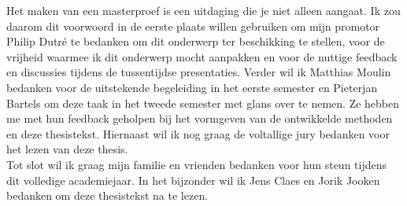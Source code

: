 \documentclass[master=cws,masteroption=mmc,oneside,english]{kulemt}
\begin{document}
\begin{preface}
  Het maken van een masterproef is een uitdaging die je niet alleen aangaat. Ik zou daarom dit voorwoord in de eerste plaats willen gebruiken om mijn promotor Philip Dutré te bedanken om dit onderwerp ter beschikking te stellen, voor de vrijheid waarmee ik dit onderwerp mocht aanpakken en voor de nuttige feedback en discussies tijdens de tussentijdse presentaties.
  Verder wil ik Matthias Moulin bedanken voor de uitstekende begeleiding in het eerste semester en Pieterjan Bartels om deze taak in het tweede semester met glans over te nemen. Ze hebben me met hun feedback geholpen bij het vormgeven van de ontwikkelde methoden en deze thesistekst. Hiernaast wil ik nog graag de voltallige jury bedanken voor het lezen van deze thesis.\\

  Tot slot wil ik graag mijn familie en vrienden bedanken voor hun steun tijdens dit volledige academiejaar. In het bijzonder wil ik Jens Claes en Jorik Jooken bedanken om deze thesistekst na te lezen.
\end{preface}

\tableofcontents*
\end{document}
